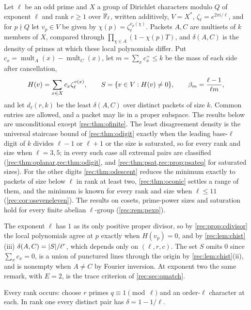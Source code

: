Let $\ell$ be an odd prime and $X$ a group of Dirichlet characters modulo $Q$ of exponent $\ell$ and rank
$r\ge1$ over $\mathbb{F}_\ell$, written additively, $V=X^*$, $\zeta_\ell=e^{2\pi i/\ell}$, and for $p\nmid Q$ let $v_p\in V$ be given by
$\chi(p)=\zeta_\ell^{v_p(\chi)}$. Packets $A,C$ are multisets of $k$ members of $X$, compared through
$\prod_{\chi\in A}(1-\chi(p)T)$, and $\delta(A,C)$ is the density of primes at which these local polynomials differ.
Put $c_x=\operatorname{mult}_A(x)-\operatorname{mult}_C(x)$, let $m=\sum_xc_x^+\le k$ be the mass of each side after cancellation,
\[
 H(v)=\sum_{x\in X}c_x\zeta_\ell^{v(x)},\qquad S=\{v\in V:H(v)\ne0\},\qquad \beta_m=\frac{\ell-1}{\ell m},
\]
and let $d_\ell(r,k)$ be the least $\delta(A,C)$ over distinct packets of size $k$. Common entries are allowed, and
a packet may lie in a proper subspace. The results below are unconditional except
\cref{rec:thm:ofinite}. The least disagreement density is the universal staircase bound of
\cref{rec:thm:odigit} exactly when the leading base-$\ell$ digit of $k$ divides $\ell-1$ or $\ell+1$ or the size is
saturated, so for every rank and size when $\ell=3,5$; in every such case all extremal pairs are
classified (\cref{rec:thm:oplanar,rec:thm:odigit}, and \cref{rec:thm:psat,rec:prop:psateq} for saturated sizes). For the other digits \cref{rec:thm:odescent} reduces the minimum
exactly to packets of size below $\ell$ in rank at least two, \cref{rec:thm:oconic} settles a range of them, and
the minimum is known for every rank and size when $\ell\le11$ (\cref{rec:cor:oseveneleven}). The results on
cosets, prime-power sizes and saturation hold for every finite abelian $\ell$-group (\cref{rec:rem:pexp}).

\begin{remark}\label{rec:lem:otrace}
The exponent $\ell$ has $1$ as its only positive proper divisor, so by \cref{rec:prop:cdivisor} the local polynomials
agree at $p$ exactly when $H(v_p)=0$, and by \cref{rec:lem:chist}(iii) $\delta(A,C)=\lvert S\rvert/\ell^r$, which depends only on
$(\ell,r,c)$. The set $S$ omits $0$ since $\sum_xc_x=0$, is a union of punctured lines through the origin by
\cref{rec:lem:chist}(ii), and is nonempty when $A\ne C$ by Fourier inversion. At exponent two the same remark,
with $E=2$, is the trace criterion of \cref{rec:sec:qmatch}.
\end{remark}

Every rank occurs: choose $r$ primes $q\equiv1\pmod\ell$ and an order-$\ell$ character at each. In rank one every
distinct pair has $\delta=1-1/\ell$.

